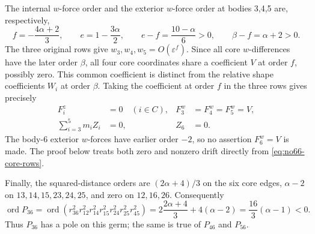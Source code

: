 \documentclass[11pt]{amsart}
\theoremstyle{remark}
\newcommand{\ord}{\operatorname{ord}}
\begin{document}
The internal $w$-force order and the exterior $w$-force order at bodies 3,4,5 are, respectively,
\[
f=-\frac{4\alpha+2}{3},\qquad e=1-\frac{3\alpha}{2},
\qquad e-f=\frac{10-\alpha}{6}>0,
\qquad \beta-f=\alpha+2>0.
\]
The three original rows give $w_3,w_4,w_5=O(\varepsilon^f)$. Since all core $w$-differences have the later order $\beta$, all four core coordinates share a coefficient $V$ at order $f$, possibly zero. This common coefficient is distinct from the relative shape coefficients $W_i$ at order $\beta$. Taking the coefficient at order $f$ in the three rows gives precisely
\begin{equation}\label{eq:no66-core-rows}
\begin{aligned}
F_i^z&=0\quad(i\in C),&
F_3^w&=F_4^w=F_5^w=V,\\
\sum_{i=3}^5m_iZ_i&=0,&Z_6&=0.
\end{aligned}
\end{equation}
The body-6 exterior $w$-forces have earlier order $-2$, so no assertion $F_6^w=V$ is made. The proof below treats both zero and nonzero drift directly from \eqref{eq:no66-core-rows}.

Finally, the squared-distance orders are $(2\alpha+4)/3$ on the six core edges, $\alpha-2$ on $13,14,15,23,24,25$, and zero on $12,16,26$. Consequently
\[
\ord P_{36}
=\ord\!\left(r_{36}^2r_{12}^2r_{14}^2r_{15}^2r_{24}^2r_{25}^2r_{45}^2\right)
=2\frac{2\alpha+4}{3}+4(\alpha-2)
=\frac{16}{3}(\alpha-1)<0.
\]
Thus $P_{36}$ has a pole on this germ; the same is true of $P_{46}$ and $P_{56}$.
\end{document}
